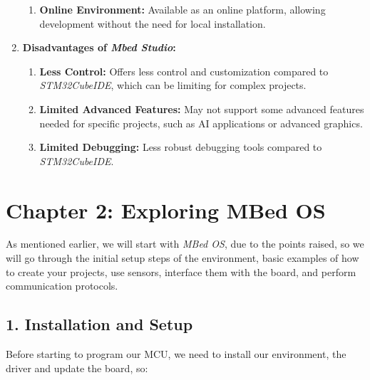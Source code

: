 \documentclass[10pt,a4paper,onecolumn]{article}
\begin{document}
\begin{enumerate}
\begin{enumerate}
      \item \textbf{Online Environment:} Available as an online platform, allowing development without the need for local installation.
    \end{enumerate}
  \item \textbf{Disadvantages of \textit{Mbed Studio}:}
    \begin{enumerate}
      \item \textbf{Less Control:} Offers less control and customization compared to \textit{STM32CubeIDE}, which can be limiting for complex projects.
      \item \textbf{Limited Advanced Features:} May not support some advanced features needed for specific projects, such as AI applications or advanced graphics.
      \item \textbf{Limited Debugging:} Less robust debugging tools compared to \textit{STM32CubeIDE}.
    \end{enumerate}
\end{enumerate}

\hypertarget{chapter-2-exploring-mbed-os}{%
\section{Chapter 2: Exploring MBed
OS}\label{chapter-2-exploring-mbed-os}}

As mentioned earlier, we will start with \textit{MBed OS}, due to the points raised, so we will go through the initial setup steps of the environment, basic examples of how to create your projects, use sensors, interface them with the board, and perform communication protocols.

\hypertarget{installation-and-setup}{%
\subsection{1. Installation and Setup}\label{installation-and-setup}}

Before starting to program our MCU, we need to install our environment, the driver and update the board, so:
\end{document}
